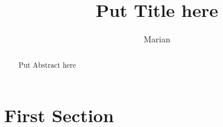 \documentclass[12pt,a4paper]{article} %
\title{Put Title here}
\author{Marian}
\begin{document}
\maketitle
\thispagestyle{fancy}

\renewcommand{\abstractname}{Abstract}

\begin{abstract}
Put Abstract here
\end{abstract}

\section{First Section}
\label{sec:first}
\end{document}

